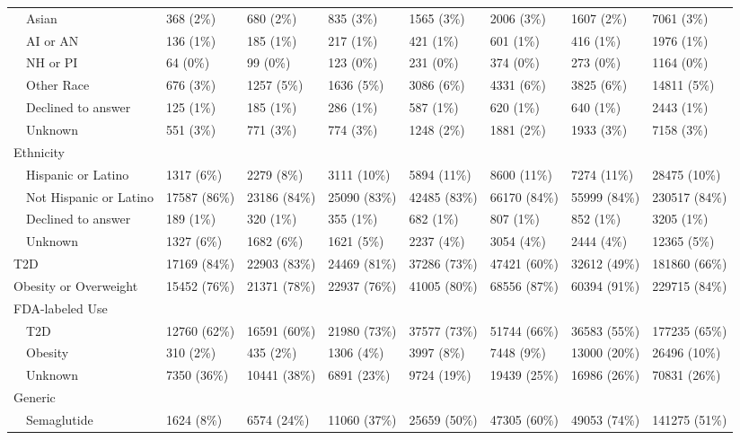 \begin{longtable}{p{}p{}p{}p{}p{}p{}p{}p{}}
    Asian & 368 (2\%) & 680 (2\%) & 835 (3\%) & 1565 (3\%) & 2006 (3\%) & 1607 (2\%) & 7061 (3\%) \\ 
    AI or AN & 136 (1\%) & 185 (1\%) & 217 (1\%) & 421 (1\%) & 601 (1\%) & 416 (1\%) & 1976 (1\%) \\ 
    NH or PI & 64 (0\%) & 99 (0\%) & 123 (0\%) & 231 (0\%) & 374 (0\%) & 273 (0\%) & 1164 (0\%) \\ 
    Other Race & 676 (3\%) & 1257 (5\%) & 1636 (5\%) & 3086 (6\%) & 4331 (6\%) & 3825 (6\%) & 14811 (5\%) \\ 
    Declined to answer & 125 (1\%) & 185 (1\%) & 286 (1\%) & 587 (1\%) & 620 (1\%) & 640 (1\%) & 2443 (1\%) \\ 
    Unknown & 551 (3\%) & 771 (3\%) & 774 (3\%) & 1248 (2\%) & 1881 (2\%) & 1933 (3\%) & 7158 (3\%) \\ 
  Ethnicity &  &  &  &  &  &  &  \\ 
    Hispanic or Latino & 1317 (6\%) & 2279 (8\%) & 3111 (10\%) & 5894 (11\%) & 8600 (11\%) & 7274 (11\%) & 28475 (10\%) \\ 
    Not Hispanic or Latino & 17587 (86\%) & 23186 (84\%) & 25090 (83\%) & 42485 (83\%) & 66170 (84\%) & 55999 (84\%) & 230517 (84\%) \\ 
    Declined to answer & 189 (1\%) & 320 (1\%) & 355 (1\%) & 682 (1\%) & 807 (1\%) & 852 (1\%) & 3205 (1\%) \\ 
    Unknown & 1327 (6\%) & 1682 (6\%) & 1621 (5\%) & 2237 (4\%) & 3054 (4\%) & 2444 (4\%) & 12365 (5\%) \\ 
  T2D & 17169 (84\%) & 22903 (83\%) & 24469 (81\%) & 37286 (73\%) & 47421 (60\%) & 32612 (49\%) & 181860 (66\%) \\ 
  Obesity or Overweight & 15452 (76\%) & 21371 (78\%) & 22937 (76\%) & 41005 (80\%) & 68556 (87\%) & 60394 (91\%) & 229715 (84\%) \\ 
  FDA-labeled Use &  &  &  &  &  &  &  \\ 
    T2D & 12760 (62\%) & 16591 (60\%) & 21980 (73\%) & 37577 (73\%) & 51744 (66\%) & 36583 (55\%) & 177235 (65\%) \\ 
    Obesity & 310 (2\%) & 435 (2\%) & 1306 (4\%) & 3997 (8\%) & 7448 (9\%) & 13000 (20\%) & 26496 (10\%) \\ 
    Unknown & 7350 (36\%) & 10441 (38\%) & 6891 (23\%) & 9724 (19\%) & 19439 (25\%) & 16986 (26\%) & 70831 (26\%) \\ 
  Generic &  &  &  &  &  &  &  \\ 
    Semaglutide & 1624 (8\%) & 6574 (24\%) & 11060 (37\%) & 25659 (50\%) & 47305 (60\%) & 49053 (74\%) & 141275 (51\%) \\ 

\end{longtable}
